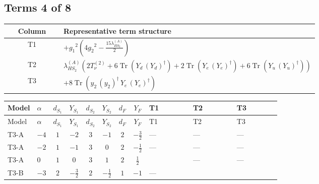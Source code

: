 \documentclass[8pt]{article}
\begin{document}
\begin{landscape}
\subsection*{Terms 4 of 8}
\begin{center}
\begin{tabular}{@{}c >{\raggedright\arraybackslash}p{0.82\linewidth}@{}}
\toprule
Column & Representative term structure \\
\midrule
T1 & \(\displaystyle +{g_1}^2 \left(4 {g_2}^2-\frac{15 {\lambda_{HS_2}^{(A)}}}{2}\right)\) \\
\midrule
T2 & \(\displaystyle {\lambda_{HS_2}^{(A)}} (2 T_{\nu}^{(2)}+6 \operatorname{Tr}\!\left({Y_d}\,\left({Y_d}\right)^{\dagger}\right)+2 \operatorname{Tr}\!\left({Y_e}\,\left({Y_e}\right)^{\dagger}\right)+6 \operatorname{Tr}\!\left({Y_u}\,\left({Y_u}\right)^{\dagger}\right))\) \\
\midrule
T3 & \(\displaystyle +8 \operatorname{Tr}\!\left({y_2}\,\left({y_2}\right)^{\dagger}\,{Y_e}\,\left({Y_e}\right)^{\dagger}\right)\) \\
\midrule
\bottomrule
\end{tabular}
\end{center}
\smallskip
\tiny
\begin{longtable}{@{}llcccccc >{\raggedright\arraybackslash}p{0.21\linewidth} >{\raggedright\arraybackslash}p{0.21\linewidth} >{\raggedright\arraybackslash}p{0.21\linewidth}@{}}
\toprule
Model & $\alpha$ & $d_{S_1}$ & $Y_{S_1}$ & $d_{S_2}$ & $Y_{S_2}$ & $d_F$ & $Y_F$ & T1 & T2 & T3 \\
\midrule
\endfirsthead
\toprule
Model & $\alpha$ & $d_{S_1}$ & $Y_{S_1}$ & $d_{S_2}$ & $Y_{S_2}$ & $d_F$ & $Y_F$ & T1 & T2 & T3 \\
\midrule
\endhead
T3-A & $-4$ & $1$ & $-2$ & $3$ & $-1$ & $2$ & $-\frac{3}{2}$ & --- & --- & --- \\
\midrule
T3-A & $-2$ & $1$ & $-1$ & $3$ & $0$ & $2$ & $-\frac{1}{2}$ & --- & --- & --- \\
\midrule
T3-A & $0$ & $1$ & $0$ & $3$ & $1$ & $2$ & $\frac{1}{2}$ & \scriptsize\adjustbox{max width=\linewidth}{$\begin{gathered} +{g_1}^2 \left(4 {g_2}^2-\frac{15 {\lambda_{HS_2}^{(A)}}}{2}\right)\end{gathered}$} & --- & --- \\
\midrule
T3-B & $-3$ & $2$ & $-\frac{3}{2}$ & $2$ & $-\frac{1}{2}$ & $1$ & $-1$ & --- & \scriptsize\adjustbox{max width=\linewidth}{$\begin{gathered} {\lambda_{HS_2}^{(A)}} (2 T_{\nu}^{(2)}+6 \operatorname{Tr}\!\left({Y_d}\,\left({Y_d}\right)^{\dagger}\right)+2 \operatorname{Tr}\!\left({Y_e}\,\left({Y_e}\right)^{\dagger}\right)+6 \operatorname{Tr}\!\left({Y_u}\,\left({Y_u}\right)^{\dagger}\right))\end{gathered}$} & \scriptsize\adjustbox{max width=\linewidth}{$\begin{gathered} +8 \operatorname{Tr}\!\left({y_2}\,\left({y_2}\right)^{\dagger}\,{Y_e}\,\left({Y_e}\right)^{\dagger}\right)\end{gathered}$} \\

\end{longtable}
\end{landscape}
\end{document}
